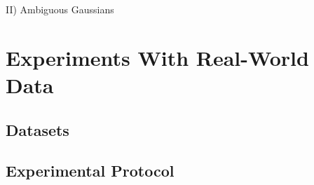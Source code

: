 II) Ambiguous Gaussians %

\section{Experiments With Real-World Data}
\subsection{Datasets}
\subsection{Experimental Protocol}
